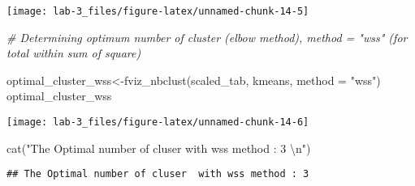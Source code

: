 \documentclass[
]{article}
\newenvironment{Shaded}{\begin{snugshade}}{\end{snugshade}}
\newcommand{\AttributeTok}[1]{\textcolor[rgb]{0.77,0.63,0.00}{#1}}
\newcommand{\CommentTok}[1]{\textcolor[rgb]{0.56,0.35,0.01}{\textit{#1}}}
\newcommand{\FunctionTok}[1]{\textcolor[rgb]{0.00,0.00,0.00}{#1}}
\newcommand{\NormalTok}[1]{#1}
\newcommand{\OtherTok}[1]{\textcolor[rgb]{0.56,0.35,0.01}{#1}}
\newcommand{\SpecialCharTok}[1]{\textcolor[rgb]{0.00,0.00,0.00}{#1}}
\newcommand{\StringTok}[1]{\textcolor[rgb]{0.31,0.60,0.02}{#1}}
\begin{document}
\begin{center}\texttt{[image: lab-3\_files/figure-latex/unnamed-chunk-14-5]} \end{center}

\begin{Shaded}
\begin{Highlighting}[]
\CommentTok{\# Determining optimum number of cluster (elbow method), method = "wss" (for total within sum of square)}

\NormalTok{optimal\_cluster\_wss}\OtherTok{\textless{}{-}}\FunctionTok{fviz\_nbclust}\NormalTok{(scaled\_tab, kmeans, }\AttributeTok{method =} \StringTok{"wss"}\NormalTok{)}
\NormalTok{optimal\_cluster\_wss}
\end{Highlighting}
\end{Shaded}

\begin{center}\texttt{[image: lab-3\_files/figure-latex/unnamed-chunk-14-6]} \end{center}

\begin{Shaded}
\begin{Highlighting}[]
\FunctionTok{cat}\NormalTok{(}\StringTok{"The Optimal number of cluser  with wss method : 3 }\SpecialCharTok{\textbackslash{}n}\StringTok{"}\NormalTok{)}
\end{Highlighting}
\end{Shaded}

\begin{verbatim}
## The Optimal number of cluser  with wss method : 3
\end{verbatim}
\end{document}
